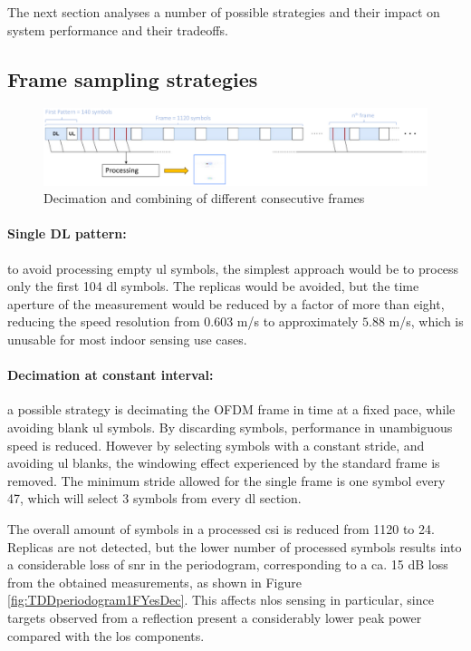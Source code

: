 			The next section analyses a number of possible strategies and their impact on system performance and their tradeoffs.    

	\subsection{Frame sampling strategies}

		    \begin{figure}[H]
		        \centering
		        \includegraphics[width=1\textwidth]{Images/TDDprocessing/TDDstrategies.eps}
		        \caption{Decimation and combining of different consecutive frames}
		        \label{fig:TDDstrategies}
		    \end{figure}
		
		    \paragraph{Single DL pattern:}
		    to avoid processing empty \gls{ul} symbols, the simplest approach would be to process only the first 104 \gls{dl} symbols. The replicas would be avoided, but the time aperture of the measurement would be reduced by a factor of more than eight, reducing the speed resolution from $0.603$ m/s to approximately $5.88$ m/s, which is unusable for most indoor sensing use cases.
		    
		    \paragraph{Decimation at constant interval:}
		     a possible strategy is decimating the OFDM frame in time at a fixed pace, while avoiding blank \gls{ul} symbols. 
		     By discarding symbols, performance in unambiguous speed is reduced. However by selecting symbols with a constant stride, and avoiding \gls{ul} blanks, the windowing effect experienced by the standard frame is removed.
		     The minimum stride allowed for the single frame is one symbol every 47, which will select 3 symbols from every \gls{dl} section.
		     
		     The overall amount of symbols in a processed \gls{csi} is reduced from 1120 to 24.
		     Replicas are not detected, but the lower number of processed symbols results into a considerable loss of \gls{snr} in the periodogram, corresponding to a ca. 15 dB loss from the obtained measurements, as shown in Figure \ref{fig:TDDperiodogram1FYesDec}. 
		     This affects \gls{nlos} sensing in particular, since targets observed from a reflection present a considerably lower peak power compared with the \gls{los} components.
		
